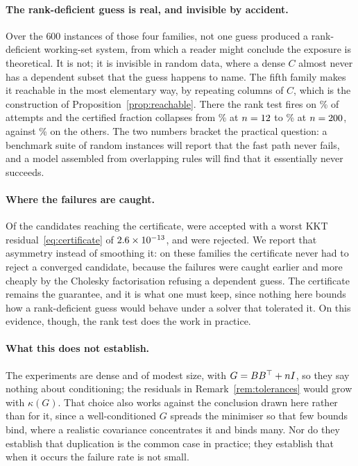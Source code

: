 \paragraph{The rank-deficient guess is real, and invisible by accident.} Over the
$600$ instances of those four families, not one guess produced a rank-deficient
working-set system, from which a reader might conclude the exposure is
theoretical. It is not; it is invisible in random data, where a dense $C$ almost
never has a dependent subset that the guess happens to name. The fifth family
makes it reachable in the most elementary way, by repeating columns of $C$, which
is the construction of Proposition~\ref{prop:reachable}. There the rank test fires
on \qpPdasSingularDup\% of attempts and the certified fraction collapses from
\qpPdasCertSmall\% at $n = 12{}$ to \qpPdasCertBig\% at
$n = 200{}$, against \qpPdasSingularBox\% on the others. The two numbers
bracket the practical question: a benchmark suite of random instances will report
that the fast path never fails, and a model assembled from overlapping rules will
find that it essentially never succeeds.

\paragraph{Where the failures are caught.} Of the candidates reaching the
certificate, \qpPdasAccepted{} were accepted with a worst KKT
residual~\eqref{eq:certificate} of $2.6\times 10^{-13}$, and \qpPdasRejected{}
were rejected. We report that asymmetry instead of smoothing it: on these
families the certificate never had to reject a converged candidate, because the
failures were caught earlier and more cheaply by the Cholesky factorisation
refusing a dependent guess. The certificate remains the guarantee, and it is what
one must keep, since nothing here bounds how a rank-deficient guess would behave
under a solver that tolerated it. On this evidence, though, the rank test does the
work in practice.

\paragraph{What this does not establish.} The experiments are dense and of modest
size, with $G = BB^{\top} + nI$, so they say nothing about conditioning; the residuals
in Remark~\ref{rem:tolerances} would grow with $\kappa(G)$. That choice also works
against the conclusion drawn here rather than for it, since a well-conditioned $G$
spreads the minimiser so that few bounds bind, where a realistic covariance
concentrates it and binds many. Nor do they establish that duplication is the
common case in practice; they establish that when it occurs the failure rate is
not small.
